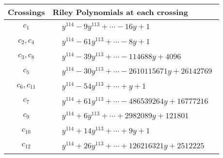 \documentclass[1p]{elsarticle_modified}
\theoremstyle{definition}
\begin{document}
\begin{tabular}{m{50pt}|m{274pt}}
Crossings & \hspace{64pt}Riley Polynomials at each crossing \\
\hline $$\begin{aligned}c_{1}\end{aligned}$$&$\begin{aligned}
&y^{114}-9 y^{113}+\cdots-16 y+1
\end{aligned}$\\
\hline $$\begin{aligned}c_{2},c_{4}\end{aligned}$$&$\begin{aligned}
&y^{114}-61 y^{113}+\cdots-8 y+1
\end{aligned}$\\
\hline $$\begin{aligned}c_{3},c_{8}\end{aligned}$$&$\begin{aligned}
&y^{114}-39 y^{113}+\cdots-114688 y+4096
\end{aligned}$\\
\hline $$\begin{aligned}c_{5}\end{aligned}$$&$\begin{aligned}
&y^{114}-30 y^{113}+\cdots-2610115671 y+26142769
\end{aligned}$\\
\hline $$\begin{aligned}c_{6},c_{11}\end{aligned}$$&$\begin{aligned}
&y^{114}-54 y^{113}+\cdots+y+1
\end{aligned}$\\
\hline $$\begin{aligned}c_{7}\end{aligned}$$&$\begin{aligned}
&y^{114}+61 y^{113}+\cdots-486539264 y+16777216
\end{aligned}$\\
\hline $$\begin{aligned}c_{9}\end{aligned}$$&$\begin{aligned}
&y^{114}+6 y^{113}+\cdots+2982089 y+121801
\end{aligned}$\\
\hline $$\begin{aligned}c_{10}\end{aligned}$$&$\begin{aligned}
&y^{114}+14 y^{113}+\cdots+9 y+1
\end{aligned}$\\
\hline $$\begin{aligned}c_{12}\end{aligned}$$&$\begin{aligned}
&y^{114}+26 y^{113}+\cdots+126216321 y+2512225
\end{aligned}$\\
\hline
\end{tabular}\\~\\
\end{document}
